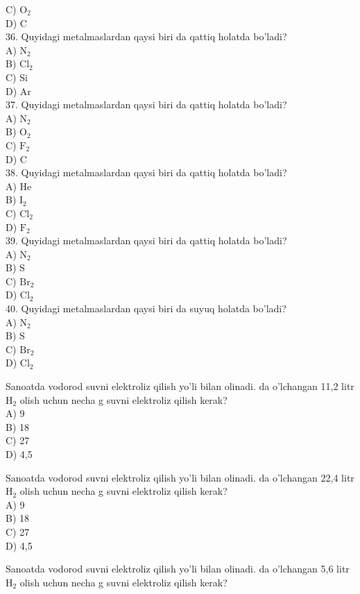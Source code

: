 C) $\mathrm{O}_{2}$\\
D) C\\
36. Quyidagi metalmaslardan qaysi biri da qattiq holatda bo'ladi?\\
A) $\mathrm{N}_{2}$\\
B) $\mathrm{Cl}_{2}$\\
C) Si\\
D) Ar\\
37. Quyidagi metalmaslardan qaysi biri da qattiq holatda bo'ladi?\\
A) $\mathrm{N}_{2}$\\
B) $\mathrm{O}_{2}$\\
C) $\mathrm{F}_{2}$\\
D) C\\
38. Quyidagi metalmaslardan qaysi biri da qattiq holatda bo'ladi?\\
A) He\\
B) $\mathrm{I}_{2}$\\
C) $\mathrm{Cl}_{2}$\\
D) $\mathrm{F}_{2}$\\
39. Quyidagi metalmaslardan qaysi biri da qattiq holatda bo'ladi?\\
A) $\mathrm{N}_{2}$\\
B) S\\
C) $\mathrm{Br}_{2}$\\
D) $\mathrm{Cl}_{2}$\\
40. Quyidagi metalmaslardan qaysi biri da suyuq holatda bo'ladi?\\
A) $\mathrm{N}_{2}$\\
B) S\\
C) $\mathrm{Br}_{2}$\\
D) $\mathrm{Cl}_{2}$
  \item Sanoatda vodorod suvni elektroliz qilish yo'li bilan olinadi. da o'lchangan 11,2 litr $\mathrm{H}_{2}$ olish uchun necha g suvni elektroliz qilish kerak?\\
A) 9\\
B) 18\\
C) 27\\
D) 4,5
  \item Sanoatda vodorod suvni elektroliz qilish yo'li bilan olinadi. da o'lchangan 22,4 litr $\mathrm{H}_{2}$ olish uchun necha g suvni elektroliz qilish kerak?\\
A) 9\\
B) 18\\
C) 27\\
D) 4,5
  \item Sanoatda vodorod suvni elektroliz qilish yo'li bilan olinadi. da o'lchangan 5,6 litr $\mathrm{H}_{2}$ olish uchun necha g suvni elektroliz qilish kerak?\\
